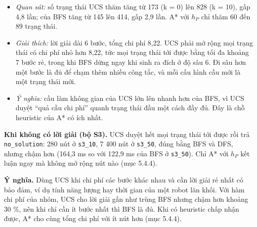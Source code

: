 \begin{itemize}
\tightlist
\item
  \emph{Quan sát:} số trạng thái UCS thăm tăng từ 173 (k = 0) lên 828 (k = 10), gấp 4,8 lần; của BFS tăng từ 145 lên 414, gấp 2,9 lần. A* với \(h_P\) chỉ thăm 60 đến 89 trạng thái.
\item
  \emph{Giải thích:} lời giải dài 6 bước, tổng chi phí 8,22. UCS phải mở rộng mọi trạng thái có chi phí nhỏ hơn 8,22, tức mọi trạng thái tới được bằng tối đa khoảng 7 bước rẻ, trong khi BFS dừng ngay khi sinh ra đích ở độ sâu 6. Đi sâu hơn một bước là đủ để chạm thêm nhiều công tắc, và mỗi cấu hình cầu mới là một trạng thái mới.
\item
  \emph{Ý nghĩa:} cầu làm không gian của UCS lớn lên nhanh hơn của BFS, vì UCS duyệt ``quả cầu chi phí'' quanh trạng thái đầu một cách đầy đủ. Đây là chỗ heuristic của A* có ích nhất.
\end{itemize}

\textbf{Khi không có lời giải (bộ S3).} UCS duyệt hết mọi trạng thái tới được rồi trả \texttt{no\_\allowbreak{}solution}: 280 nút ở \texttt{s3\_\allowbreak{}10}, 7 400 nút ở \texttt{s3\_\allowbreak{}50}, đúng bằng BFS và DFS, nhưng chậm hơn (164,3 ms so với 122,9 ms của BFS ở \texttt{s3\_\allowbreak{}50}). Chỉ A* với \(h_P\) kết luận ngay mà không mở rộng nút nào (mục 5.4.4).

\textbf{Ý nghĩa.} Dùng UCS khi chi phí các bước khác nhau và cần lời giải rẻ nhất có bảo đảm, ví dụ tính năng lượng hay thời gian của một robot lăn khối. Với hàm chi phí của nhóm, UCS cho lời giải gần như trùng BFS nhưng chậm hơn khoảng 30 \%, nên khi chỉ cần ít bước nhất thì BFS là đủ. Khi có heuristic chấp nhận được, A* cho cùng tổng chi phí với ít nút hơn (mục 5.4.4).
